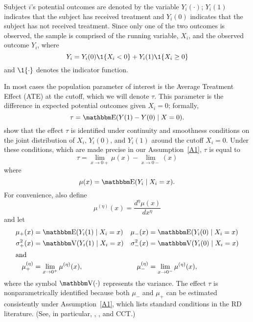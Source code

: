 \documentclass[12pt,fleqn]{article}
\begin{document}
Subject $i$'s potential outcomes are denoted by the variable $Y_i(\cdot)$;
$Y_i(1)$ indicates that the subject has received treatment and $Y_i(0)$
indicates that the subject has not received treatment. Since only one of the two
outcomes is observed, the sample is comprised of the running variable, $X_{i}$,
and the observed outcome $Y_i$, where
\begin{equation*}
  Y_{i}=Y_{i}(0) \1\{X_{i}<0\}+Y_{i}(1) \1\{X_{i} \geq 0\}
\end{equation*}
and $\1\{ \cdot\}$ denotes the indicator function.

In most cases the population parameter of interest is the Average Treatment
Effect (ATE) at the cutoff, which we will denote $\tau$. This parameter is the
difference in expected potential outcomes given $X_i = 0$; formally,
\begin{equation*}
  \tau=\E(Y(1)-Y(0) \mid X=0).
\end{equation*}
\cite{HTV2001} show that the effect $\tau$ is identified under continuity and
smoothness conditions on the joint distribution of $X_i$, $Y_i(0)$, and $Y_i(1)$
around the cutoff $X_i = 0$. Under these conditions, which are made precise
in our Assumption~\ref{A1}, $\tau$ is equal to
\begin{equation*}
  \tau = \lim_{x \to 0+} \mu(x) - \lim_{x \to 0-}(x)
\end{equation*}
where
\begin{equation*}
  \mu(x)= \E(Y_{i} \mid X_{i}=x).
\end{equation*}
For convenience, also define
\begin{equation*}
  \mu^{(\eta)}(x)=\frac{d^{\eta}\mu(x)}{dx^{\eta}}
\end{equation*}
and let
\begin{align*}
  \mu_{+}(x)
  &= \E( Y_{i}(1) \mid X_{i}=x )
  &\mu_{-}(x)
  &= \E( Y_{i}(0) \mid X_{i}=x ) \\
  \sigma^{2}_{+}(x) &= \V( Y_{i}(1) \mid X_{i}=x )
  &\sigma^{2}_{-}(x)&=\V( Y_{i}(0) \mid X_{i}=x ) \\
\intertext{and}
  \mu^{(\eta)}_{+}
  &= \lim_{x \rightarrow 0^{+}}\mu^{(\eta)}(x),
  &\mu^{(\eta)}_{-}
  &= \lim_{x \rightarrow 0^{-}}\mu^{(\eta)}(x),
\end{align*}
where the symbol $\V(\cdot)$ represents the variance.  The effect $\tau$ is
nonparametrically identified because both $\mu_-$ and $\mu_+$ can be estimated
consistently under Assumption~\ref{A1}, which lists standard conditions in the
RD literature. (See, in particular, \citealp{HTV2001}, \citealp{Porter03}, and
CCT.)
\end{document}

